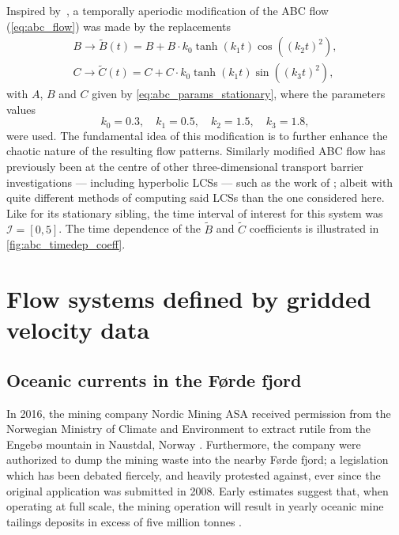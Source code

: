 Inspired by~\textcite{oettinger2016autonomous}, a temporally aperiodic
modification of the ABC flow (\cref{eq:abc_flow}) was made by the replacements
\begin{equation}
    \label{eq:abc_params_nonstationary}
    \begin{gathered}
    B\to{}\widetilde{B}(t) = B + B\cdot{}k_{0}\tanh(k_{1}t)\cos({({k_{2}t})}^{2}),\\
    C\to{}\widetilde{C}(t) = C + C\cdot{}k_{0}\tanh(k_{1}t)\sin({({k_{3}t})}^{2}),
    \end{gathered}
\end{equation}
with $A$, $B$ and $C$ given by \cref{eq:abc_params_stationary}, where the
parameters values
\begin{equation}
    \label{eq:abc_params_nonstationary_frequencies}
    k_{0}=0.3,\quad k_{1}=0.5,\quad k_{2}=1.5,\quad k_{3}=1.8,
\end{equation}
were used. The fundamental idea of this modification is to further enhance
the chaotic nature of the resulting flow patterns. Similarly modified
ABC flow has previously been at the centre of other three-dimensional transport
barrier investigations --- including hyperbolic LCSs --- such as the work of
\textcite{blazevski2014hyperbolic}; albeit with quite different methods of
computing said LCSs than the one considered here. Like for its stationary
sibling, the time interval of interest for this system was $\mathcal{I}=[0,5]$.
The time dependence of the $\widetilde{B}$ and  $\widetilde{C}$ coefficients is
illustrated in \cref{fig:abc_timedep_coeff}.



\section{Flow systems defined by gridded velocity data}
\label{sec:flow_systems_defined_by_gridded_velocity_data}

\subsection{Oceanic currents in the Førde fjord}
\label{ssub:oceanic_currents_in_the_forde_fjord}

In 2016, the mining company Nordic Mining ASA received permission from the
Norwegian Ministry of Climate and Environment to extract rutile from the
Engebø mountain in Naustdal, Norway \parencite{garvik2017gruvekonflikten,%
haugan2015sjodeponi}. Furthermore, the company were authorized to dump
the mining waste into the nearby Førde fjord; a legislation which has been
debated fiercely, and heavily protested against, ever since the original
application was submitted in 2008. Early estimates suggest that, when operating
at full scale, the mining operation will result in yearly oceanic mine tailings
deposits in excess of five million tonnes \parencite{garvik2017gruvekonflikten}.

